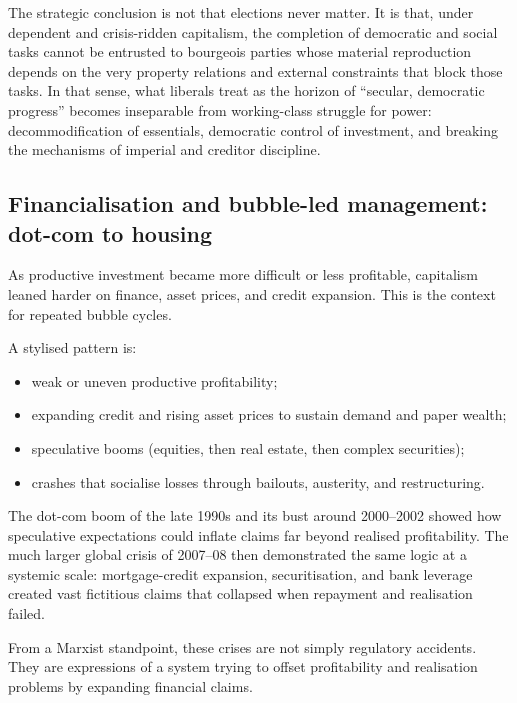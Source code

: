 The strategic conclusion is not that elections never matter. It is that, under dependent and crisis-ridden
capitalism, the completion of democratic and social tasks cannot be entrusted to bourgeois parties whose
material reproduction depends on the very property relations and external constraints that block those tasks.
In that sense, what liberals treat as the horizon of ``secular, democratic progress'' becomes inseparable from
working-class struggle for power: decommodification of essentials, democratic control of investment, and
breaking the mechanisms of imperial and creditor discipline.\cite{PeetUnholyTrinity,HarveyNeoliberalism}


\subsection{Financialisation and bubble-led management: dot-com to housing}
\label{subsec:dotcom-2008}

As productive investment became more difficult or less profitable, capitalism leaned harder on finance, asset prices,
and credit expansion. This is the context for repeated bubble cycles.

A stylised pattern is:
\begin{itemize}[leftmargin=1.5em]
  \item weak or uneven productive profitability;
  \item expanding credit and rising asset prices to sustain demand and paper wealth;
  \item speculative booms (equities, then real estate, then complex securities);
  \item crashes that socialise losses through bailouts, austerity, and restructuring.
\end{itemize}

The dot-com boom of the late 1990s and its bust around 2000--2002 showed how speculative expectations could inflate
claims far beyond realised profitability. The much larger global crisis of 2007--08 then demonstrated the same logic
at a systemic scale: mortgage-credit expansion, securitisation, and bank leverage created vast fictitious claims that
collapsed when repayment and realisation failed.

From a Marxist standpoint, these crises are not simply regulatory accidents. They are expressions of a system trying
to offset profitability and realisation problems by expanding financial claims.

